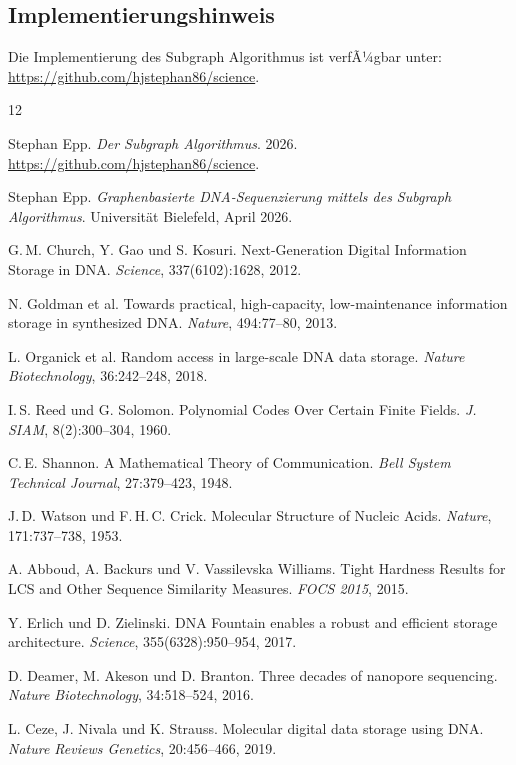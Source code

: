 ﻿\documentclass[a4paper,12pt]{article}
\theoremstyle{definition}
\begin{document}
\subsection{Implementierungshinweis}

Die Implementierung des Subgraph Algorithmus ist verfÃ¼gbar unter:
\url{https://github.com/hjstephan86/science}.

\begin{thebibliography}{12}

        Stephan Epp.
        \textit{Der Subgraph Algorithmus}. 2026.
        \url{https://github.com/hjstephan86/science}.

        Stephan Epp.
        \textit{Graphenbasierte DNA-Sequenzierung mittels des Subgraph
        Algorithmus}.
        Universit\"{a}t Bielefeld, April 2026.

        G.\,M. Church, Y. Gao und S. Kosuri.
        Next-Generation Digital Information Storage in DNA.
        \textit{Science}, 337(6102):1628, 2012.

        N. Goldman et al.
        Towards practical, high-capacity, low-maintenance information
        storage in synthesized DNA.
        \textit{Nature}, 494:77--80, 2013.

        L. Organick et al.
        Random access in large-scale DNA data storage.
        \textit{Nature Biotechnology}, 36:242--248, 2018.

        I.\,S. Reed und G. Solomon.
        Polynomial Codes Over Certain Finite Fields.
        \textit{J. SIAM}, 8(2):300--304, 1960.

        C.\,E. Shannon.
        A Mathematical Theory of Communication.
        \textit{Bell System Technical Journal}, 27:379--423, 1948.

        J.\,D. Watson und F.\,H.\,C. Crick.
        Molecular Structure of Nucleic Acids.
        \textit{Nature}, 171:737--738, 1953.

        A. Abboud, A. Backurs und V. Vassilevska Williams.
        Tight Hardness Results for LCS and Other Sequence Similarity
        Measures.
        \textit{FOCS 2015}, 2015.

        Y. Erlich und D. Zielinski.
        DNA Fountain enables a robust and efficient storage architecture.
        \textit{Science}, 355(6328):950--954, 2017.

        D. Deamer, M. Akeson und D. Branton.
        Three decades of nanopore sequencing.
        \textit{Nature Biotechnology}, 34:518--524, 2016.

        L. Ceze, J. Nivala und K. Strauss.
        Molecular digital data storage using DNA.
        \textit{Nature Reviews Genetics}, 20:456--466, 2019.

\end{thebibliography}
\end{document}
